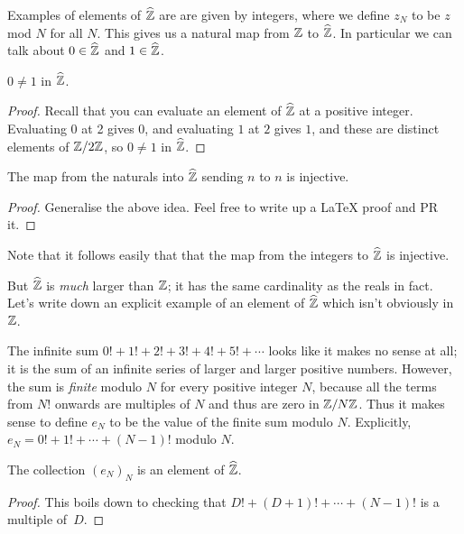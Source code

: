 Examples of elements of $\widehat{\mathbb{Z}}$ are are given by integers, where we define $z_N$ to be $z$
mod $N$ for all $N$. This gives us a natural map from $\mathbb{Z}$ to $\widehat{\mathbb{Z}}$. In particular we
can talk about $0\in\widehat{\mathbb{Z}}$ and $1\in\widehat{\mathbb{Z}}$.

\begin{lemma}
    \label{ZHat.nontrivial}
    \leanok
    $0\not=1$ in $\widehat{\mathbb{Z}}$.
\end{lemma}
\begin{proof}
    \leanok
    Recall that you can evaluate an element of $\widehat{\mathbb{Z}}$ at a positive integer.
    Evaluating $0$ at 2 gives $0$, and evaluating $1$ at $2$ gives $1$, and these
    are distinct elements of $\mathbb{Z}/2\mathbb{Z}$, so $0\not=1$ in $\widehat{\mathbb{Z}}$.
\end{proof}

\begin{lemma}
    \label{ZHat.charZero}
    \leanok
    The map from the naturals into $\widehat{\mathbb{Z}}$ sending $n$ to $n$ is injective.
\end{lemma}
\begin{proof}
    \leanok
    Generalise the above idea. Feel free to write up a LaTeX proof and PR it.
\end{proof}

Note that it follows easily that that the map from the integers to $\widehat{\mathbb{Z}}$ is injective.

But $\widehat{\mathbb{Z}}$
is \emph{much} larger than $\mathbb{Z}$; it has the same cardinality as the reals in fact.
Let's write down an explicit example of an element of $\widehat{\mathbb{Z}}$ which isn't obviously in $\mathbb{Z}$.

\begin{definition}
    \label{ZHat.e}
    \leanok
    The infinite sum $0!+1!+2!+3!+4!+5!+\cdots$ looks
    like it makes no sense at all; it is the sum of an infinite series of larger and larger
    positive numbers.
    However, the sum is \emph{finite} modulo $N$ for every positive integer $N$, because
    all the terms from $N!$ onwards are multiples of $N$ and thus are zero in $\mathbb{Z}/N\mathbb{Z}$.
    Thus it makes sense to define $e_N$ to be the value of the finite sum modulo $N$.
    Explicitly, $e_N=0!+1!+\cdots+(N-1)!$ modulo $N$.
\end{definition}

\begin{lemma}
    \label{ZHat.e_def}
    \leanok
    The collection $(e_N)_N$ is an element of $\widehat{\mathbb{Z}}$.
\end{lemma}
\begin{proof}
    \leanok
    This boils down to checking that $D!+(D+1)!+\cdots+(N-1)!$ is a multiple of~$D$.
\end{proof}

